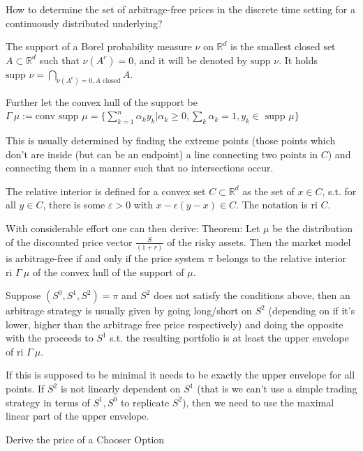 How to determine the set of arbitrage-free prices in the discrete time setting
for a continuously distributed underlying?

The support of a Borel probability measure \( \nu \) on \( \mathbb{R}^d \) is the smallest
closed set \( A \subset \mathbb{R}^d \) such that \( \nu(A^c) = 0 \), and it will be denoted by \( \text{supp } \nu \).
It holds
\( \text{supp } \nu = \bigcap_{\nu(A^c)=0, A \text{ closed}} A \).

Further let the convex hull of the support be
\( \Gamma\ \mu := \text{conv } \text{supp } \mu = \{ \sum_{k=1}^n \alpha_k y_k | \alpha_k \geq 0 , \sum_k \alpha_k = 1, y_k \in \text{ supp } \mu \} \)

This is usually determined by finding the extreme points (those points which don't are inside (but can be an endpoint) a line connecting two points in \( C \)) and connecting them in a manner such that no intersections occur.

The relative interior is defined for a convex set \( C \subset \mathbb{R}^d \) as the set of \( x \in C \), s.t. for all \( y \in C \), 
there is some \( \varepsilon > 0 \) with \( x - \epsilon(y - x) \in C \). The notation is \( \text{ri } C \).

With considerable effort one can then derive: 
Theorem:
Let \( \mu \) be the distribution of the discounted price vector \( \frac{S}{(1 + r)} \) of
the risky assets. Then the market model is arbitrage-free if and only if the price system \( \pi \) belongs 
to the relative interior \( \text{ri }\Gamma\ \mu \) of the convex hull of the support of \( \mu \).

Suppose \( (S^0, S^1, S^2) = \pi \) and \( S^2 \) does not satisfy the conditions above, then an arbitrage strategy is usually given
by going long/short on \( S^2 \) (depending on if it's lower, higher than the arbitrage free price respectively) and doing the opposite 
with the proceeds to \( S^1 \) s.t. the resulting portfolio is at least the upper envelope of \( \text{ri }\Gamma\ \mu \).

If this is supposed to be minimal it needs to be exactly the upper envelope for all points. If \( S^2 \) is not linearly dependent on \( S^1 \)
(that is we can't use a simple trading strategy in terms of \( S^1, S^0 \) to replicate \( S^2 \)), then we need to use the maximal linear part 
of the upper envelope.


Derive the price of a Chooser Option

